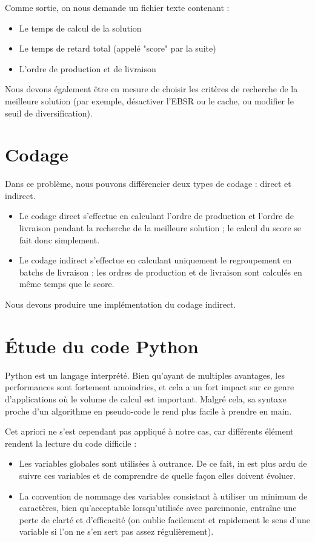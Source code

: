 \documentclass[hideweeklyreports]{polytech/polytech}
\begin{document}
			Comme sortie, on nous demande un fichier texte contenant :
			\begin{itemize}
				\item Le temps de calcul de la solution
				\item Le temps de retard total (appelé "score" par la suite)
				\item L'ordre de production et de livraison
			\end{itemize}
			
			Nous devons également être en mesure de choisir les critères de recherche de la meilleure solution (par exemple, désactiver l'EBSR ou le cache, ou modifier le seuil de diversification).
			
		\section{Codage}
			Dans ce problème, nous pouvons différencier deux types de codage : direct et indirect.
			\begin{itemize}
				\item Le codage direct s'effectue en calculant l'ordre de production et l'ordre de livraison pendant la recherche de la meilleure solution ; le calcul du score se fait donc simplement.
				\item Le codage indirect s'effectue en calculant uniquement le regroupement en batchs de livraison : les ordres de production et de livraison sont calculés en même temps que le score.
			\end{itemize}
			
			Nous devons produire une implémentation du codage indirect.
			
		
		\section{Étude du code Python}
			Python est un langage interprété. Bien qu'ayant de multiples avantages, les performances sont fortement amoindries, et cela a un fort impact sur ce genre d'applications où le volume de calcul est important. Malgré cela, sa syntaxe proche d'un algorithme en pseudo-code le rend plus facile à prendre en main.
			
			Cet apriori ne s'est cependant pas appliqué à notre cas, car différents élément rendent la lecture du code difficile :
			\begin{itemize}
				\item Les variables globales sont utilisées à outrance. De ce fait, in est plus ardu de suivre ces variables et de comprendre de quelle façon elles doivent évoluer.
				\item La convention de nommage des variables consistant à utiliser un minimum de caractères, bien qu'acceptable lorsqu'utilisée avec parcimonie, entraîne une perte de clarté et d'efficacité (on oublie facilement et rapidement le sens d'une variable si l'on ne s'en sert pas assez régulièrement).
			\end{itemize}
			
\end{document}

